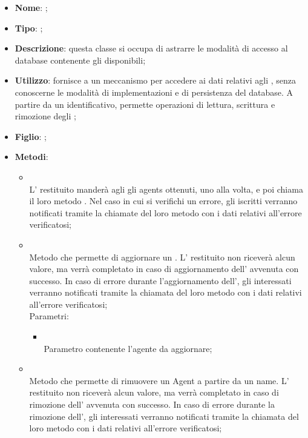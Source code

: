 \begin{itemize}
	\item \textbf{Nome}: ;
	\item \textbf{Tipo}: ;
	\item \textbf{Descrizione}: questa classe si occupa di astrarre le modalità di accesso al database contenente gli  disponibili;
	\item \textbf{Utilizzo}: fornisce a  un meccanismo per accedere ai dati relativi agli , senza conoscerne le modalità di implementazioni e di persistenza del database. A partire da un identificativo, permette operazioni di lettura, scrittura e rimozione degli ;
	\item \textbf{Figlio}: ;
	\item \textbf{Metodi}:
	\begin{itemize}
		\item[]  \\
		L' restituito manderà agli  gli agents ottenuti, uno alla volta, e poi chiama il loro metodo . Nel caso in cui si verifichi un errore, gli  iscritti verranno notificati tramite la chiamate del loro metodo  con i dati relativi all'errore verificatosi;\\
		\item[]  \\
		Metodo che permette di aggiornare un .  L' restituito non riceverà alcun valore, ma verrà completato in caso di aggiornamento dell' avvenuta con successo. In caso di errore durante l'aggiornamento dell', gli  interessati verranno notificati tramite la chiamata del loro metodo  con i dati relativi all'errore verificatosi;\\
		Parametri:
		\begin{itemize}
			\item {} \\
			Parametro contenente l'agente da aggiornare;
		\end{itemize}
		\item[]  \\
		Metodo che permette di rimuovere un Agent a partire da un name.  L' restituito non riceverà alcun valore, ma verrà completato in caso di rimozione dell' avvenuta con successo. In caso di errore durante la rimozione dell', gli  interessati verranno notificati tramite la chiamata del loro metodo  con i dati relativi all'errore verificatosi;\\

\end{itemize}
\end{itemize}

